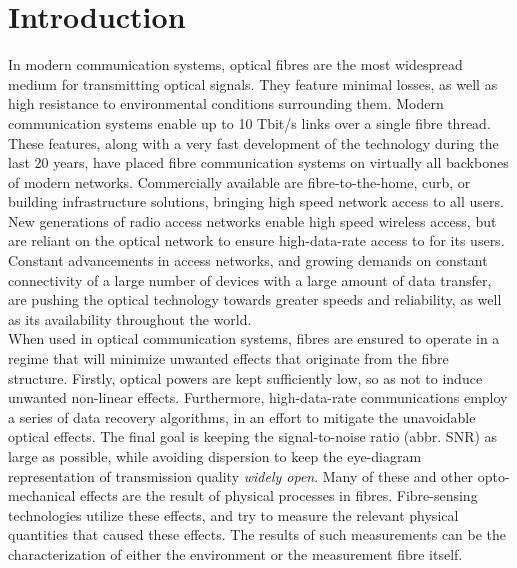 \documentclass{standalone}
\begin{document}
\chapter{Introduction}
\setcounter{page}\thestranica


In modern communication systems, optical fibres are the most widespread medium for transmitting optical signals. They feature minimal losses, as well as high resistance to environmental conditions surrounding them. Modern communication systems enable up to 10 Tbit/s links over a single fibre thread. These features, along with a very fast development of the technology during the last 20 years, have placed fibre communication systems on virtually all backbones of modern networks. Commercially available are fibre-to-the-home, curb, or building infrastructure solutions, bringing high speed network access to all users. New generations of radio access networks enable high speed wireless access, but are reliant on the optical network to ensure high-data-rate access to for its users. Constant advancements in access networks, and growing demands on constant connectivity of a large number of devices with a large amount of data transfer, are pushing the optical technology towards greater speeds and reliability, as well as its availability throughout the world. \\

When used in optical communication systems, fibres are ensured to operate in a regime that will minimize unwanted effects that originate from the fibre structure. Firstly, optical powers are kept sufficiently low, so as not to induce unwanted non-linear effects. Furthermore, high-data-rate communications employ a series of data recovery algorithms, in an effort to mitigate the unavoidable optical effects. The final goal is keeping the signal-to-noise ratio (abbr. SNR) as large as possible, while avoiding dispersion to keep the eye-diagram representation of transmission quality \textit{widely open}. Many of these and other opto-mechanical effects are the result of physical processes in fibres. Fibre-sensing technologies utilize these effects, and try to measure the relevant physical quantities that caused these effects. The results of such measurements can be the characterization of either the environment or the measurement fibre itself. \\
\end{document}
